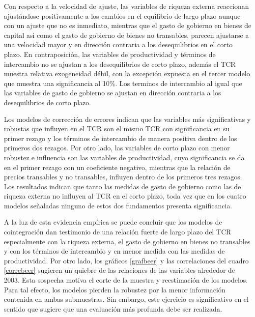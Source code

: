 \documentclass[12pt,letterpaper]{article}
\begin{document}
Con respecto a la velocidad de ajuste, las variables de riqueza externa reaccionan ajustándose positivamente a los cambios en el equilibrio de largo plazo aunque con un ajuste que no es inmediato, mientras que el gasto de gobierno en bienes de capital asi como el gasto de gobierno de bienes no transables, parecen ajustarse a una velocidad mayor y en dirección contraria a los desequilibrios en el corto plazo. En contraposición, las variables de productividad y términos de intercambio no se ajustan a los desequilibrios de corto plazo, además el TCR muestra relativa exogeneidad débil, con la excepción expuesta en el tercer modelo que muestra una significancia al 10\%. Los terminos de intercambio al igual que las variables de gasto de gobierno se ajustan en dirección contraria a los desequilibrios de corto plazo. 

Los modelos de corrección de errores indican que las variables más significativas y robustas que influyen en el TCR son el mismo TCR con significancia en su primer rezago y los términos de intercambio de manera positiva dentro de los primeros dos rezagos. Por otro lado, las variables de corto plazo con menor robustez e influencia son las variables de  productividad, cuyo significancia se da en el primer rezago con un coeficiente negativo, mientras que la relación de precios transables y no transables, influyen dentro de los primeros tres rezagos. Los resultados indican que tanto las medidas de gasto de gobierno como las de riqueza externa no influyen al TCR en el corto plazo, toda vez que en los cuatro modelos señaladas ninguno de estos dos fundamentos presenta significancia.  

A la luz de esta evidencia empírica se puede concluir que los modelos de cointegración dan testimonio de una relación fuerte de largo plazo del TCR especialmente con la riqueza externa, el gasto de gobierno en bienes no transables y con los términos de intercambio y en menor medida con  las medidas de productividad. Por otro lado, los gráficos \ref{grafbeer} y las correlaciones del cuadro \ref{correbeer} sugieren un quiebre de las relaciones de las variables alrededor de 2003. Esta sospecha motiva el corte de la muestra y reestimación de los modelos. Para tal efecto, los modelos pierden la robustez por la menor información contenida en ambas submuestras. Sin embargo, este ejercicio es significativo en el sentido que sugiere que una evaluación más profunda debe ser realizada. 
\end{document}
